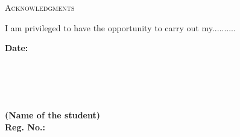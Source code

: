  \vspace*{0.1cm}
\begin{center}
{\LARGE \textsc{Acknowledgments}}
\end{center}
 \vspace{0.3cm}


I am privileged to have the opportunity to carry out my..........\\

\vspace{1in}

\begin{minipage}[l]{0.2\textwidth}%
\textbf{Date:}~
\\
\\
\\
\\
\\
\end{minipage}
\hfill
\begin{minipage}[r]{0.7\textwidth}%
\begin{flushright}
    \textbf{(Name of the student)}\\
    \textbf{Reg. No.:}~\\
    \\
    \\
\end{flushright}
\end{minipage}
